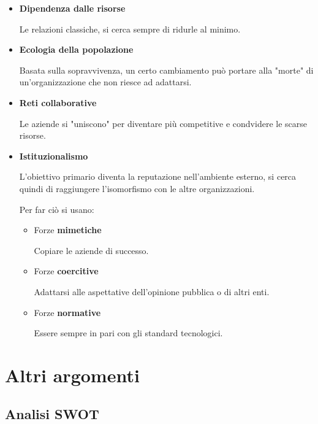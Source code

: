 \documentclass{article}
\begin{document}
\begin{itemize}
    \item \textbf{Dipendenza dalle risorse}

        Le relazioni classiche, si cerca sempre di ridurle al minimo.
    
    \item \textbf{Ecologia della popolazione}

        Basata sulla sopravvivenza, un certo cambiamento può portare alla "morte" di un'organizzazione che non riesce ad adattarsi.
    
    \item \textbf{Reti collaborative}

        Le aziende si "uniscono" per diventare più competitive e condvidere le scarse risorse.
    
    \item \textbf{Istituzionalismo}

        L'obiettivo primario diventa la reputazione nell'ambiente esterno, si cerca quindi di raggiungere l'isomorfismo con le altre organizzazioni. \newline
        
        Per far ciò si usano:
            \begin{itemize}
                \item Forze \textbf{mimetiche}

                    Copiare le aziende di successo.
                
                \item Forze \textbf{coercitive}

                    Adattarsi alle aspettative dell'opinione pubblica o di altri enti.
                
                \item Forze \textbf{normative}

                    Essere sempre in pari con gli standard tecnologici.
                
            \end{itemize}
    
\end{itemize}

\newpage

\section{Altri argomenti}

\subsection{Analisi SWOT}
\end{document}
